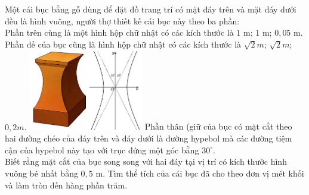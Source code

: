 \begin{ex}%
\immini
{
    Một cái bục bằng gỗ dùng để đặt đồ trang trí có mặt đáy trên và mặt đáy dưới đều là hình vuông, người thợ thiết kế cái bục này theo ba phần:\\
Phần trên cùng là một hình hộp chữ nhật có các kích thước là $1$ m; $1$ m; $0{,}05$ m.\\
Phần đế của bục cũng là hình hộp chữ nhật có các kích thước là $\sqrt{2}m$; $\sqrt{2}m$; $0{,}2m$.
}
{
    \includegraphics[width=5cm]{img/HXN-12-21}
}
Phần thân (giữ của bục có mặt cắt theo hai đường chéo của đáy trên và đáy dưới là đường hypebol mà các đường tiệm cận của hypebol này tạo với trục đứng một góc bằng $30^{\circ}$.\\
Biết rằng mặt cắt của bục song song với hai đáy tại vị trí có kích thước hình vuông bé nhất bằng $0{,}5$ m. Tìm thể tích của cái bục đã cho theo đơn vị mét khối và làm tròn đến hàng phần trăm.
\end{ex}
